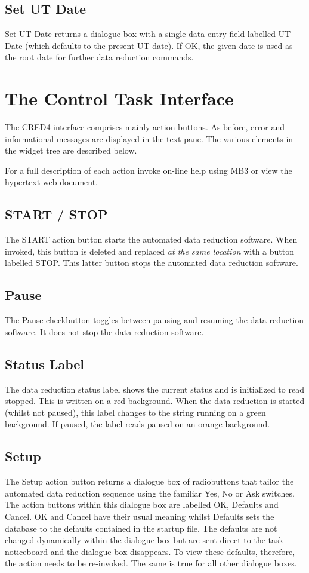 \documentclass[a4paper]{book}
\renewcommand{\_}{{\tt\char'137}}
\begin{document}
\subsection{Set UT Date}
{\sf Set UT Date} returns a dialogue box with a single data entry field labelled {\sf UT Date} 
(which defaults to the present UT date). If {\sf OK}, the given date is used as the root
date for further data reduction commands.

\section{The Control Task Interface}
The CRED4 interface comprises mainly action buttons.
As before, error and informational messages are displayed in the text pane.
The various elements in the widget tree are described below.

For a full description of each action invoke on-line help using MB3 or view the hypertext web document.

\subsection{START / STOP}
The {\sf START} action button starts the
automated data reduction software. When invoked, this button is deleted and replaced
{\em at the same location} with a button labelled {\sf STOP}. This latter
button stops the automated data reduction software. 

\subsection{Pause}
The {\sf Pause} checkbutton toggles between pausing and resuming the
data reduction software. It does not stop the data reduction software.

\subsection{Status Label}
The data reduction status label shows the current status and is initialized to read 
{\sc stopped}. This is written on a red background. When the data reduction is started (whilst not paused), this
label changes to the string {\sc running} on a green background. If paused, the label reads {\sc paused} on an
orange background. 

\subsection{Setup}
The {\sf Setup} action button returns a dialogue box of radiobuttons that tailor the automated data
reduction sequence using the familiar {\sf Yes}, {\sf No} or {\sf Ask} switches. The action buttons within this dialogue
box are labelled {\sf OK}, {\sf Defaults} and {\sf Cancel}.
{\sf OK} and {\sf Cancel} have their usual meaning whilst {\sf Defaults} sets the database to the defaults contained
in the startup file. The defaults are not changed dynamically within the dialogue box but
are sent direct to the task noticeboard and the dialogue box disappears. To view these defaults,
therefore, the action needs to be re-invoked. The same is true for all other dialogue boxes.
\end{document}
